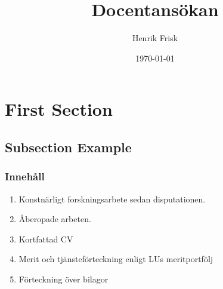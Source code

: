 \documentclass{beamer}
\title[Docentansökan]{Docentansökan} %
\author{Henrik Frisk} %
\institute[UCLA] %
{
Musikhögskolan i Malmö \\ %
}
\date{\today} %
\begin{document}
\begin{frame}
\titlepage %
\end{frame}



\section{First Section} %

\subsection{Subsection Example} %

\begin{frame}
\frametitle{Innehåll}

\begin{enumerate}
\item Konstnärligt forskningsarbete sedan disputationen.
\item Åberopade arbeten.
\item Kortfattad CV
\item Merit och tjänsteförteckning enligt LUs meritportfölj
\item Förteckning över bilagor
\end{enumerate}

\end{frame}
\end{document}
